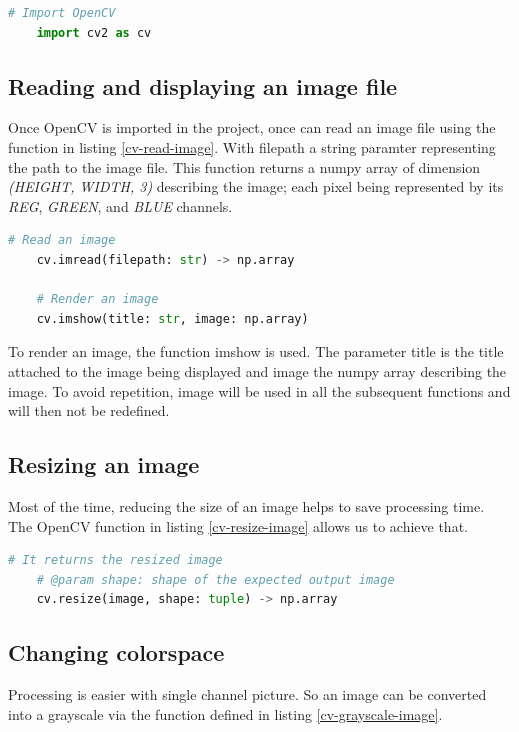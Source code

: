 \documentclass{scrartcl}
\newcommand{\param}[1]{{\ttfamily\footnotesize{#1}}}
\begin{document}
  \begin{lstlisting}[language=Python, caption={Import OpenCV}]
    # Import OpenCV
    import cv2 as cv
  \end{lstlisting}

  \subsection{Reading and displaying an image file}
  Once OpenCV is imported in the project, once can read an image file using the function in listing
  \ref{cv-read-image}. With \param{filepath} a string paramter representing the path to
  the image file. This function returns a numpy array of dimension \textit{(HEIGHT, WIDTH, 3)} describing
  the image; each pixel being represented by its \textit{REG}, \textit{GREEN}, and \textit{BLUE} channels.

  \begin{lstlisting}[language=Python, caption={Reading an image file}, label={cv-read-image}]
    # Read an image
    cv.imread(filepath: str) -> np.array

    # Render an image
    cv.imshow(title: str, image: np.array)
  \end{lstlisting}

  To render an image, the function \param{imshow} is used. The parameter \param{title} is the title
  attached to the image being displayed and \param{image} the numpy array describing the image.
  To avoid repetition, \param{image} will be used in all the subsequent functions and will then not
  be redefined.

  \subsection{Resizing an image}

  Most of the time, reducing the size of an image helps to save processing time. The OpenCV function
  in listing \ref{cv-resize-image} allows us to achieve that.

  \begin{lstlisting}[language=Python, caption={Rendering an image}, label={cv-resize-image}]
    # It returns the resized image
    # @param shape: shape of the expected output image
    cv.resize(image, shape: tuple) -> np.array
  \end{lstlisting}

  \subsection{Changing colorspace}
  Processing is easier with single channel picture. So an image can be converted into a grayscale via
  the function defined in listing \ref{cv-grayscale-image}.
\end{document}

